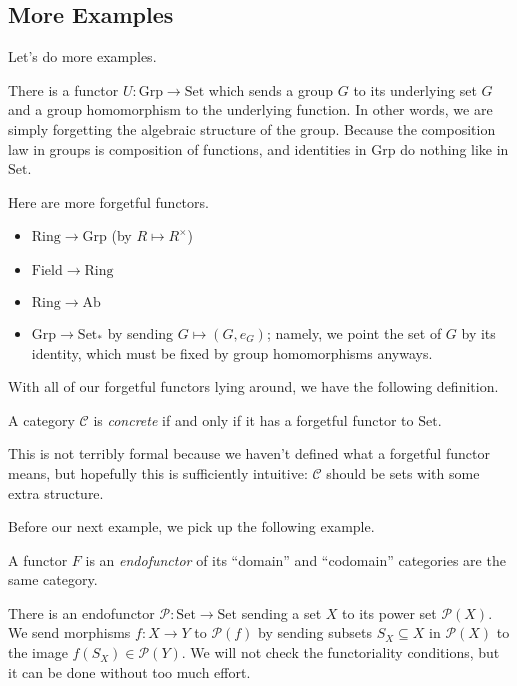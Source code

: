 \subsection{More Examples}
Let's do more examples.
\begin{ex}[Forgetful]
	There is a functor $U:\mathrm{Grp}\to\mathrm{Set}$ which sends a group $G$ to its underlying set $G$ and a group homomorphism to the underlying function. In other words, we are simply forgetting the algebraic structure of the group. Because the composition law in groups is composition of functions, and identities in $\mathrm{Grp}$ do nothing like in $\mathrm{Set}$.
\end{ex}
\begin{example}[Forgetful]
	Here are more forgetful functors.
	\begin{itemize}
		\item $\mathrm{Ring}\to\mathrm{Grp}$ (by $R\mapsto R^\times$) 
		\item $\mathrm{Field}\to\mathrm{Ring}$
		\item $\mathrm{Ring}\to\mathrm{Ab}$
		\item $\mathrm{Grp}\to\mathrm{Set}_*$ by sending $G\mapsto(G,e_G)$; namely, we point the set of $G$ by its identity, which must be fixed by group homomorphisms anyways.
	\end{itemize}
\end{example}
With all of our forgetful functors lying around, we have the following definition.
\begin{definition}[Concrete]
	A category $\mathcal C$ is \textit{concrete} if and only if it has a forgetful functor to $\mathrm{Set}$.
\end{definition}
This is not terribly formal because we haven't defined what a forgetful functor means, but hopefully this is sufficiently intuitive: $\mathcal C$ should be sets with some extra structure.

Before our next example, we pick up the following example.
\begin{definition}[Endofunctor]
	A functor $F$ is an \textit{endofunctor} of its ``domain'' and ``codomain'' categories are the same category.
\end{definition}
\begin{example}
	There is an endofunctor $\mathcal P:\mathrm{Set}\to\mathrm{Set}$ sending a set $X$ to its power set $\mathcal P(X)$. We send morphisms $f:X\to Y$ to $\mathcal P(f)$ by sending subsets $S_X\subseteq X$ in $\mathcal P(X)$ to the image $f(S_X)\in\mathcal P(Y)$. We will not check the functoriality conditions, but it can be done without too much effort.
\end{example}

